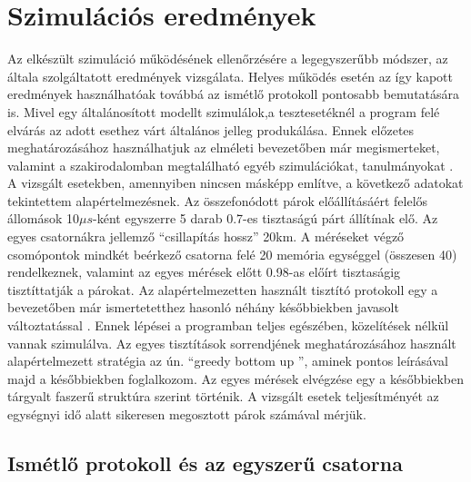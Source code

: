 \chapter{Szimulációs eredmények}

Az elkészült szimuláció működésének ellenőrzésére a legegyszerűbb módszer, az általa szolgáltatott eredmények vizsgálata. Helyes működés esetén az így kapott eredmények használhatóak továbbá az ismétlő protokoll pontosabb bemutatására is. Mivel egy általánosított modellt szimulálok,a tesztesetéknél a program felé elvárás az adott esethez várt általános jelleg produkálása. Ennek előzetes meghatározásához használhatjuk az elméleti bevezetőben már megismerteket, valamint  a szakirodalomban megtalálható egyéb szimulációkat, tanulmányokat \cite{briegel1998quantum}\cite{van2009system}\cite{bernardes2011rate}. A vizsgált esetekben, amennyiben nincsen másképp említve, a következő adatokat tekintettem alapértelmezésnek. 
Az összefonódott párok előállításáért felelős állomások 10$\mu s$-ként egyszerre 5 darab 0.7-es tisztaságú párt állítínak elő. Az egyes csatornákra jellemző ``csillapítás hossz'' 20km. A méréseket végző csomópontok mindkét beérkező csatorna felé 20 memória egységgel (összesen 40) rendelkeznek, valamint az egyes mérések előtt 0.98-as előírt tisztaságig tisztíttatják a párokat. Az alapértelmezetten használt tisztító protokoll egy a bevezetőben már ismertetetthez hasonló \cite{deutsch1996quantum} néhány későbbiekben javasolt változtatással \cite{briegel1998quantum}. Ennek lépései a programban teljes egészében, közelítések nélkül vannak szimulálva. Az egyes tisztítások sorrendjének meghatározásához használt alapértelmezett stratégia az ún. ``greedy bottom up '', aminek pontos leírásával majd a későbbiekben foglalkozom. Az egyes mérések elvégzése egy a későbbiekben tárgyalt faszerű struktúra szerint történik. A vizsgált esetek teljesítményét az egységnyi idő alatt sikeresen megosztott párok számával mérjük.

\section{Ismétlő protokoll és az egyszerű csatorna}

